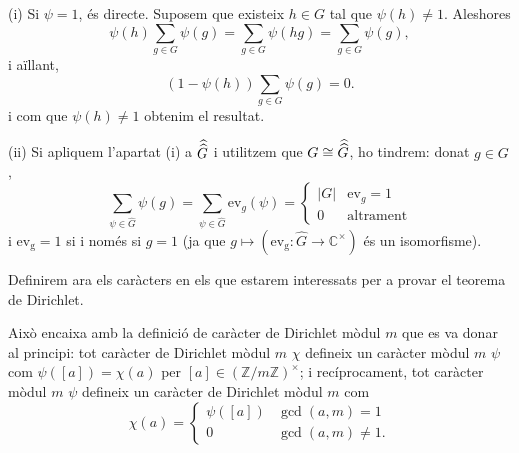 \begin{pf}
    (i) Si $\psi = 1$, és directe. Suposem que existeix $h \in G$ tal que $\psi(h) \neq 1$. Aleshores
    \[
        \psi(h)\sum_{g \in G}\psi(g) = \sum_{g \in G} \psi(hg) = \sum_{g \in G} \psi(g),
    \]
    i aïllant,
    \[
        (1-\psi(h))\sum_{g\in G}\psi(g) = 0.
    \]
    i com que $\psi(h) \neq 1$ obtenim el resultat.

    (ii) Si apliquem l'apartat (i) a $\skew{3}\widehat{\widehat{G}}$ i utilitzem que $G \cong \skew{3}\widehat{\widehat{G}}$, ho tindrem: donat $g \in G$, 
    \[
        \sum_{\psi \in \widehat{G}} \psi(g) = \sum_{\psi \in \widehat{G}} \mathrm{ev}_g(\psi)  = \begin{cases}
                |G| & \mathrm{ev}_g=1 \\
                0 & \text{altrament}
                \end{cases}
    \]
    i $\mathrm{ev_g} = 1$ si i només si $g = 1$ (ja que $g \mapsto (\mathrm{ev_g}\colon \widehat{G} \to \mathbb{C}^\times)$ és un isomorfisme).
\end{pf}

Definirem ara els caràcters en els que estarem interessats per a provar el teorema de Dirichlet.

Això encaixa amb la definició de caràcter de Dirichlet mòdul $m$ que es va donar al principi: tot caràcter de Dirichlet mòdul $m$ $\chi$ defineix un caràcter 
mòdul $m$ $\psi$ com $\psi([a]) = \chi(a)$ per $[a] \in (\mathbb{Z}/m\mathbb{Z})^\times$; i recíprocament, tot caràcter mòdul $m$ $\psi$ defineix un caràcter 
de Dirichlet mòdul $m$ com 
\[
    \chi(a) = \begin{cases}
        \psi([a]) & \gcd(a, m) = 1 \\
        0  & \gcd(a, m) \neq 1.
    \end{cases}
\]

